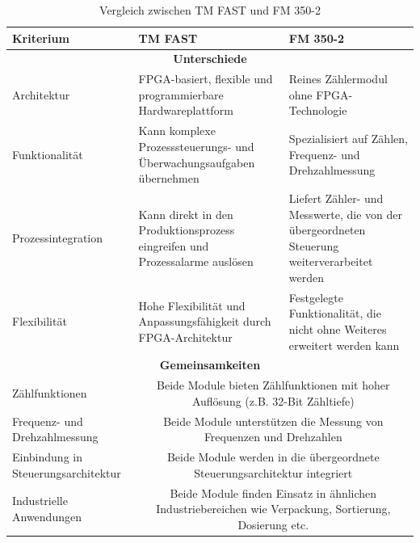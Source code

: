 \begin{table}[h]
    \centering
    \renewcommand{\arraystretch}{1.3}
    \begin{tabularx}{\textwidth}{|X|X|X|}
        \hline
        \textbf{Kriterium} & \textbf{TM FAST} & \textbf{FM 350-2} \\
        \hline
        \multicolumn{3}{|c|}{\textbf{Unterschiede}} \\
        \hline
        Architektur & FPGA-basiert, flexible und programmierbare Hardwareplattform & Reines Zählermodul ohne FPGA-Technologie \\
        \hline
        Funktionalität & Kann komplexe Prozesssteuerungs- und Überwachungsaufgaben übernehmen & Spezialisiert auf Zählen, Frequenz- und Drehzahlmessung \\
        \hline
        Prozessintegration & Kann direkt in den Produktionsprozess eingreifen und Prozessalarme auslösen & Liefert Zähler- und Messwerte, die von der übergeordneten Steuerung weiterverarbeitet werden \\
        \hline
        Flexibilität & Hohe Flexibilität und Anpassungsfähigkeit durch FPGA-Architektur & Festgelegte Funktionalität, die nicht ohne Weiteres erweitert werden kann \\
        \hline
        \multicolumn{3}{|c|}{\textbf{Gemeinsamkeiten}} \\
        \hline
        Zählfunktionen & \multicolumn{2}{c|}{Beide Module bieten Zählfunktionen mit hoher Auflösung (z.B. 32-Bit Zähltiefe)} \\
        \hline
        Frequenz- und Drehzahlmessung & \multicolumn{2}{c|}{Beide Module unterstützen die Messung von Frequenzen und Drehzahlen} \\
        \hline
        Einbindung in Steuerungsarchitektur & \multicolumn{2}{c|}{Beide Module werden in die übergeordnete Steuerungsarchitektur integriert} \\
        \hline
        Industrielle Anwendungen & \multicolumn{2}{c|}{Beide Module finden Einsatz in ähnlichen Industriebereichen wie Verpackung, Sortierung, Dosierung etc.} \\
        \hline
    \end{tabularx}
    \caption{Vergleich zwischen TM FAST und FM 350-2}
    \label{tab:tm_fast_vs_fm350-2}
\end{table}

